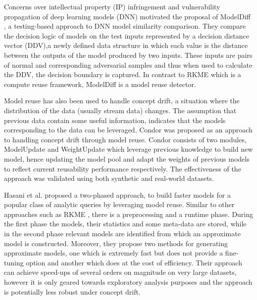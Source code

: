 \documentclass{mpaper}
\begin{document}
Concerns over intellectual property (IP) infringement and vulnerability propagation of deep learning models (DNN) motivated the proposal of ModelDiff \cite{DNNSimilarity}, a testing-based approach to DNN model similarity comparison. They compare the decision logic of models on the test inputs represented by a decision distance vector (DDV),a newly defined data structure in which each value is the distance between the outputs of the model produced by two inputs. These inputs are pairs of normal and corresponding adversarial samples and thus when used to calculate the DDV, the decision boundary is captured. In contrast to RKME \cite{KernelMMD} which is a compute reuse framework, ModelDiff is a model reuse detector. 

Model reuse has also been used to handle concept drift, a situation where the distribution of the data (usually stream data) changes. The assumption that previous data contain some useful information, indicates that the models corresponding to the data can be leveraged. Condor was proposed \cite{ConceptDrift} as an approach to handling concept drift through model reuse. Condor consists of two modules, ModelUpdate and WeightUpdate which leverage previous knowledge to build new model, hence updating the model pool and adapt the weights of previous models to reflect current reusability performance respectively. The effectiveness of the approach was validated using both synthetic and real-world datasets. 

Hasani et al. \cite{MaterializationReuse} proposed a two-phased approach, to build faster models for a popular class of analytic queries by leveraging model reuse. Similar to other approaches such as RKME \cite{KernelMMD}, there is a preprocessing and a runtime phase. During the first phase the models, their statistics and some meta-data are stored, while in the second phase relevant models are identified from which an approximate model is constructed. Moreover, they propose two methods for generating approximate models, one which is extremely fast but does not provide a fine-tuning option and another which does at the cost of efficiency. Their approach can achieve speed-ups of several orders on magnitude on very large datasets, however it is only geared towards exploratory analysis purposes and the approach is potentially less robust under concept drift. 
\end{document}
